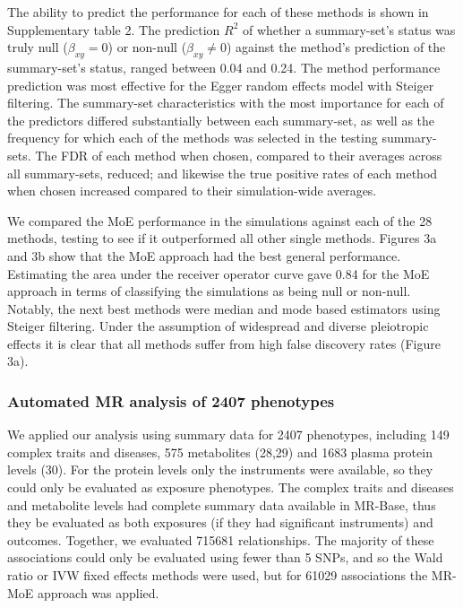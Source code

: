 \documentclass[]{article}
\begin{document}
The ability to predict the performance for each of these methods is
shown in Supplementary table 2. The prediction \(R^2\) of whether a
summary-set's status was truly null (\(\beta_{xy}=0\)) or non-null
(\(\beta_{xy} \neq 0\)) against the method's prediction of the
summary-set's status, ranged between 0.04 and 0.24. The method
performance prediction was most effective for the Egger random effects
model with Steiger filtering. The summary-set characteristics with the
most importance for each of the predictors differed substantially
between each summary-set, as well as the frequency for which each of the
methods was selected in the testing summary-sets. The FDR of each method
when chosen, compared to their averages across all summary-sets,
reduced; and likewise the true positive rates of each method when chosen
increased compared to their simulation-wide averages.

We compared the MoE performance in the simulations against each of the
28 methods, testing to see if it outperformed all other single methods.
Figures 3a and 3b show that the MoE approach had the best general
performance. Estimating the area under the receiver operator curve gave
0.84 for the MoE approach in terms of classifying the simulations as
being null or non-null. Notably, the next best methods were median and
mode based estimators using Steiger filtering. Under the assumption of
widespread and diverse pleiotropic effects it is clear that all methods
suffer from high false discovery rates (Figure 3a).

\subsubsection{Automated MR analysis of 2407
phenotypes}\label{automated-mr-analysis-of-2407-phenotypes}

We applied our analysis using summary data for 2407 phenotypes,
including 149 complex traits and diseases, 575 metabolites (28,29) and
1683 plasma protein levels (30). For the protein levels only the
instruments were available, so they could only be evaluated as exposure
phenotypes. The complex traits and diseases and metabolite levels had
complete summary data available in MR-Base, thus they be evaluated as
both exposures (if they had significant instruments) and outcomes.
Together, we evaluated 715681 relationships. The majority of these
associations could only be evaluated using fewer than 5 SNPs, and so the
Wald ratio or IVW fixed effects methods were used, but for 61029
associations the MR-MoE approach was applied.
\end{document}
